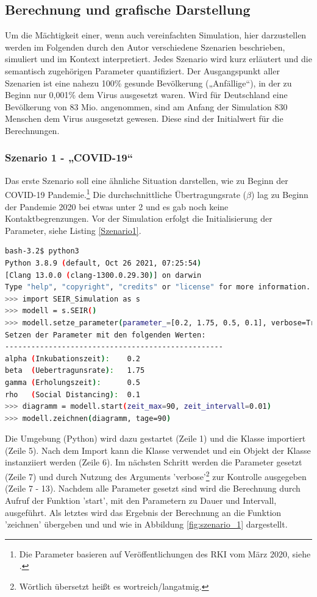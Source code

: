 \documentclass[12pt]{article}
\begin{document}


\subsection{Berechnung und grafische Darstellung}
Um die Mächtigkeit einer, wenn auch vereinfachten Simulation, hier darzustellen werden im Folgenden durch den Autor verschiedene Szenarien beschrieben, simuliert und im Kontext interpretiert. Jedes Szenario wird kurz erläutert und die semantisch zugehörigen Parameter quantifiziert. Der Ausgangspunkt aller Szenarien ist eine nahezu 100\% gesunde Bevölkerung („Anfällige“), in der zu Beginn nur 0,001\% dem Virus ausgesetzt waren. Wird für Deutschland eine Bevölkerung von 83 Mio. angenommen, sind am Anfang der Simulation 830 Menschen dem Virus ausgesetzt gewesen. Diese sind der Initialwert für die Berechnungen.

\subsubsection{Szenario 1 - „COVID-19“}
Das erste Szenario soll eine ähnliche Situation darstellen, wie zu Beginn der COVID-19 Pandemie.\footnote{Die Parameter basieren auf Veröffentlichungen des RKI vom März 2020, siehe \cite{SEIRParameter}.} Die durchschnittliche Übertragungsrate ($\beta$) lag zu Beginn der Pandemie 2020 bei etwas unter 2 und es gab noch keine Kontaktbegrenzungen. Vor der Simulation erfolgt die Initialisierung der Parameter, siehe Listing \ref{Szenario1}.

\begin{lstlisting}[language=Bash, caption=Szenario 1 - COVID-19, label=Szenario1]
bash-3.2$ python3
Python 3.8.9 (default, Oct 26 2021, 07:25:54) 
[Clang 13.0.0 (clang-1300.0.29.30)] on darwin
Type "help", "copyright", "credits" or "license" for more information.
>>> import SEIR_Simulation as s
>>> modell = s.SEIR()
>>> modell.setze_parameter(parameter_=[0.2, 1.75, 0.5, 0.1], verbose=True)
Setzen der Parameter mit den folgenden Werten:
--------------------------------------------------
alpha (Inkubationszeit):    0.2
beta  (Uebertragunsrate):   1.75
gamma (Erholungszeit):      0.5
rho   (Social Distancing):  0.1
>>> diagramm = modell.start(zeit_max=90, zeit_intervall=0.01)
>>> modell.zeichnen(diagramm, tage=90)
\end{lstlisting}

Die Umgebung (Python) wird dazu gestartet (Zeile 1) und die Klasse importiert (Zeile 5). Nach dem Import kann die Klasse verwendet und ein Objekt der Klasse instanziiert werden (Zeile 6). Im nächsten Schritt werden die Parameter gesetzt (Zeile 7) und durch Nutzung des Arguments 'verbose'\footnote{Wörtlich übersetzt heißt es wortreich/langatmig.} zur Kontrolle ausgegeben (Zeile 7 - 13). Nachdem alle Parameter gesetzt sind wird die Berechnung durch Aufruf der Funktion 'start', mit den Parametern zu Dauer und Intervall, ausgeführt. Als letztes wird das Ergebnis der Berechnung an die Funktion 'zeichnen' übergeben und und wie in Abbildung \ref{fig:szenario_1} dargestellt.
\end{document}
